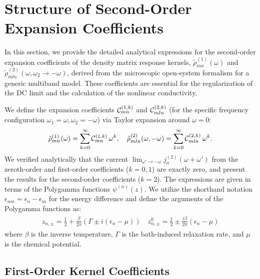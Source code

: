 \documentclass[twocolumn, prx, reprint, amsfonts, amsmath, amssymb, longbibliography, floatfix, aps]{revtex4-2}
\begin{document}
\section{Structure of Second-Order Expansion Coefficients}
\label{S-C}

In this section, we provide the detailed analytical expressions for the second-order expansion coefficients of the density matrix response kernels, $\tilde{\rho}_{m n}^{(1)} (\omega)$ and $\tilde{\rho}_{m l n}^{(2)} (\omega, \omega_2 \to - \omega)$, derived from the microscopic open-system formalism for a generic multiband model. These coefficients are essential for the regularization of the DC limit and the calculation of the nonlinear conductivity.

We define the expansion coefficients ${\cal C}_{mn}^{(1, k)}$ and ${\cal C}_{mln}^{(2, k)}$ (for the specific frequency configuration $\omega_1=\omega, \omega_2=-\omega$) via Taylor expansion around $\omega=0$:
\begin{align}
\tilde{\rho}_{m n}^{(1)} (\omega) = \sum_{k=0}^{\infty} {\cal C}_{mn}^{(1, k)} \, \omega^k, \quad
\tilde{\rho}_{m l n}^{(2)} (\omega, -\omega) = \sum_{k=0}^{\infty} {\cal C}_{mln}^{(2, k)} \, \omega^k.
\end{align}
We verified analytically that the current $\lim_{\omega' \to -\omega}j_a^{(2)}(\omega + \omega')$ from the zeroth-order and first-order coefficients ($k=0,1$) are exactly zero, and present the results for the second-order coefficients ($k=2$). The expressions are given in terms of the Polygamma functions $\psi^{(n)}(z)$. We utilize the shorthand notation $\epsilon_{nm} = \epsilon_n - \epsilon_m$ for the energy difference and define the arguments of the Polygamma functions as:
\begin{align}
\begin{aligned}
z_{n, \pm} = \frac{1}{2} + \frac{\beta}{2\pi}(\Gamma \pm i(\epsilon_n - \mu)) \quad
z_{n, \pm}^0 = \frac{1}{2} \pm \frac{i \beta}{2\pi} (\epsilon_n - \mu)
\end{aligned}
\end{align}
where $\beta$ is the inverse temperature, $\Gamma$ is the bath-induced relaxation rate, and $\mu$ is the chemical potential.

\subsection{First-Order Kernel Coefficients}
\end{document}
